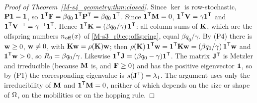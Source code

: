 \begin{proof}[Proof of Theorem~\ref{M-s4_geometry:thm:closed}]
  Since $\ker$ is row-stochastic, $\mathbf{P}\boldsymbol{1}=\boldsymbol{1}$, so $\boldsymbol{1}^{\mathsf{T}}\mathbf{F}=\beta q_0\,\boldsymbol{1}^{\mathsf{T}}\mathbf{P}^{\mathsf{T}}=\beta q_0\,\boldsymbol{1}^{\mathsf{T}}$.
  Since $\boldsymbol{1}^{\mathsf{T}}\mathbf{M}=0$, $\boldsymbol{1}^{\mathsf{T}}\mathbf{V}=\gamma\boldsymbol{1}^{\mathsf{T}}$ and $\boldsymbol{1}^{\mathsf{T}}\mathbf{V}^{-1}=\gamma^{-1}\boldsymbol{1}^{\mathsf{T}}$. Hence
  $\boldsymbol{1}^{\mathsf{T}}\mathbf{K}=(\beta q_0/\gamma)\,\boldsymbol{1}^{\mathsf{T}}$: all column sums of $\mathbf{K}$, which are the offspring numbers
  $n_{\mathrm{off}}(x)$ of \eqref{M-s3_r0:eq:offspring}, equal $\beta q_0/\gamma$. By (P4) there is $\mathbf{w}\ge0$, $\mathbf{w}\ne0$,
  with $\mathbf{K}\mathbf{w}=\rho(\mathbf{K})\mathbf{w}$; then
  $\rho(\mathbf{K})\,\boldsymbol{1}^{\mathsf{T}}\mathbf{w}=\boldsymbol{1}^{\mathsf{T}}\mathbf{K}\mathbf{w}=(\beta q_0/\gamma)\,\boldsymbol{1}^{\mathsf{T}}\mathbf{w}$ and $\boldsymbol{1}^{\mathsf{T}}\mathbf{w}>0$, so
  $R_0=\beta q_0/\gamma$. Likewise $\boldsymbol{1}^{\mathsf{T}}\mathbf{J}=(\beta q_0-\gamma)\boldsymbol{1}^{\mathsf{T}}$. The matrix $\mathbf{J}^{\mathsf{T}}$ is Metzler
  and irreducible (because $\mathbf{M}$ is, and $\mathbf{F}\ge0$) and has the positive eigenvector $\boldsymbol{1}$, so by (P1) the
  corresponding eigenvalue is $s(\mathbf{J}^{\mathsf{T}})=\lambda_1$. The argument uses only the irreducibility of $\mathbf{M}$
  and $\boldsymbol{1}^{\mathsf{T}}\mathbf{M}=0$, neither of which depends on the size or shape of $\Omega$, on the mobilities or on
  the hopping rule.
\end{proof}

